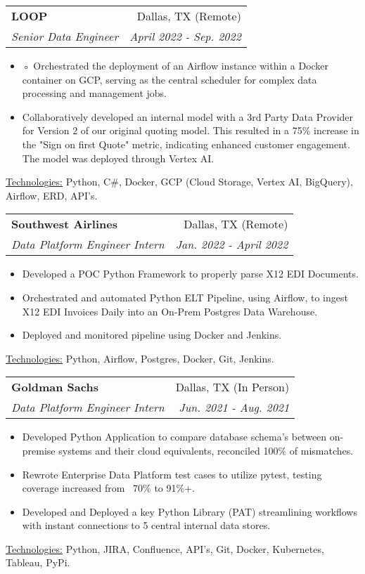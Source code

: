 \documentclass[11pt, a4paper]{article}
\makeatletter
\newcommand{\resumeItem}[1]{%
  \item\small{
    #1
  }
}
\newcommand{\resumeSubheading}[4]{
  \vspace{8pt}\item%
    \begin{tabular*}{0.97\textwidth}[t]{l@{\extracolsep{\fill}}r}
      \textbf{#1} & #2 \\
      \textit{\small#3} & \textit{\small #4} \\
    \end{tabular*}\vspace{-5pt}
}
\newcommand{\resumeItemListStart}{\begin{itemize}}
\newcommand{\resumeItemListEnd}{\end{itemize}\vspace{-5pt}}
\newcommand{\resumeTech}[2]{
 \underline{#1:} #2
}
\makeatother
\begin{document}

\resumeSubheading
      {LOOP}{Dallas, TX (Remote)}
      {Senior Data Engineer}{April 2022 - Sep. 2022}
      \resumeItemListStart
        \resumeItem{◦ Orchestrated the deployment of an Airflow instance within a Docker container on GCP, serving as the central scheduler for complex data processing and management jobs.}
        \resumeItem{Collaboratively developed an internal model with a 3rd Party Data Provider for Version 2 of our original quoting model. This resulted in a 75\% increase in the "Sign on first Quote" metric, indicating enhanced customer engagement. The model was deployed through Vertex AI.}
      \resumeItemListEnd
      \resumeTech{Technologies}{Python, C\#, Docker, GCP (Cloud Storage, Vertex AI, BigQuery), Airflow, ERD, API's.}\\


\resumeSubheading
      {Southwest Airlines}{Dallas, TX (Remote)}
      {Data Platform Engineer Intern}{Jan. 2022 - April 2022}
      \resumeItemListStart
          \resumeItem{Developed a POC Python Framework to properly parse X12 EDI Documents.}
          \resumeItem{Orchestrated and automated Python ELT Pipeline, using Airflow, to ingest X12 EDI Invoices Daily into an On-Prem Postgres Data Warehouse.}
          \resumeItem{Deployed and monitored pipeline using Docker and Jenkins.}
      \resumeItemListEnd
      \resumeTech{Technologies}{Python, Airflow, Postgres, Docker, Git, Jenkins.}\\



\resumeSubheading
      {Goldman Sachs}{Dallas, TX (In Person)}
      {Data Platform Engineer Intern}{Jun. 2021 - Aug. 2021}
      \resumeItemListStart
      \resumeItem{Developed Python Application to compare database schema's between on-premise systems and their cloud equivalents, reconciled 100\% of mismatches.}
      \resumeItem{Rewrote Enterprise Data Platform test cases to utilize pytest, testing coverage increased from ~70\% to 91\%+.}
      \resumeItem{Developed and Deployed a key Python Library (PAT) streamlining workflows with instant connections to 5 central internal data stores.}
      \resumeItemListEnd
      \resumeTech{Technologies}{Python, JIRA, Confluence, API's, Git, Docker, Kubernetes, Tableau, PyPi.}\\
\end{document}
